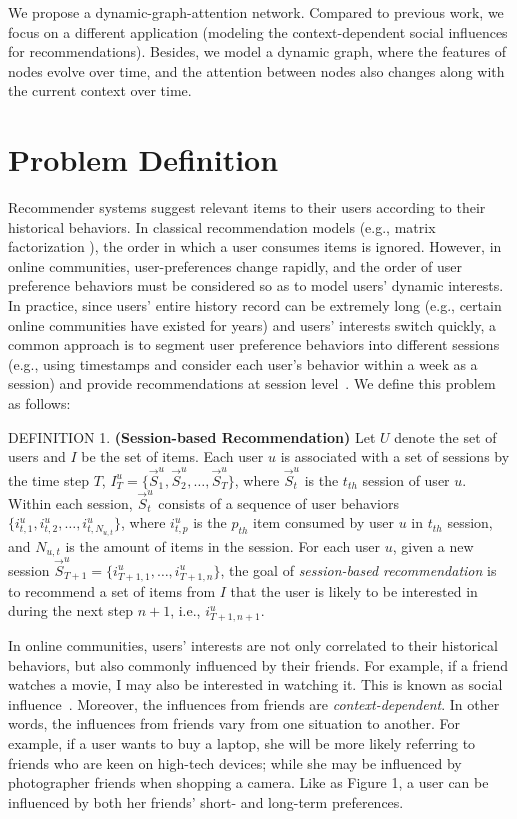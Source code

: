 \documentclass[sigconf]{acmart}
\begin{document}
We propose a dynamic-graph-attention network. Compared to previous work, we focus on a different application (modeling the context-dependent social influences for recommendations). Besides, we model a dynamic graph, where the features of nodes evolve over time, and the attention between nodes also changes along with the current context over time. 
 \section{Problem Definition}

Recommender systems suggest relevant items to their users according to their historical behaviors. In classical recommendation models (e.g., matrix factorization \cite{mnih2008probabilistic}), the order in which a user consumes items is ignored. However, in online communities, user-preferences change rapidly, and the order of user preference behaviors must be considered so as to model users' dynamic interests. In practice, since users' entire history record can be extremely long (e.g., certain online communities have existed for years) and users' interests switch quickly, a common approach is to segment user preference behaviors into different sessions (e.g., using timestamps and consider each user's behavior within a week as a session) and provide recommendations at session level~\cite{hidasi2016session}. We define this problem as follows:

\textup{DEFINITION 1.} \textbf{(Session-based Recommendation)} Let $U$ denote the set of users and $I$ be the set of items. 
Each user $u$ is associated with a set of sessions by the time step $T$, $I^u_T=\{ \vec{S}_1^u, \vec{S}_2^u,\ldots, \vec{S}_T^u\}$, 
where $\vec{S}_t^u$
is the $t_{th}$ session of user $u$. Within each session, $\vec{S}_t^u$ consists of a sequence of user behaviors $\{i_{t,1}^{u}, i_{t,2}^{u},\ldots, i_{t,N_{u,t}}^{u}\}$, where $i_{t,p}^{u}$ is the $p_{th}$ item consumed by user $u$ in $t_{th}$ session, and $N_{u,t}$ is the amount of items in the session. For each user $u$, given a new session $\vec{S}_{T+1}^u=\{i_{T+1,1}^{u},\ldots, i_{T+1,n}^{u}\}$, the goal of \emph{session-based recommendation} is to recommend a set of items from $I$ that the user is likely to be interested in during the next step $n+1$, i.e., $i_{T+1,n+1}^{u}$.

In online communities, users' interests are not only correlated to their historical behaviors, but also commonly influenced by their friends.
For example, if a friend watches a movie, I may also be interested in watching it. This is known as social influence~\cite{tang2009social}. Moreover, the influences from friends are \emph{context-dependent}. In other words, the influences from friends vary from one situation to another. For example, if a user wants to buy a laptop, she will be more likely referring to friends who are keen on high-tech devices; while she may be influenced by photographer friends when shopping a camera. Like as Figure 1, a user can be influenced by both her friends' short- and long-term preferences. 
\end{document}

